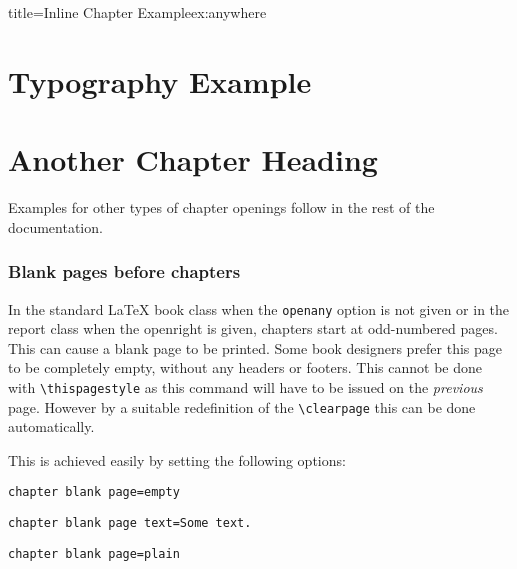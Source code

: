 \begin{decription}
\begin{texexample}{title=Inline Chapter Example}{ex:anywhere}
\chapter{Typography Example}
\lorem
\chapter{Another Chapter Heading}
\lorem
\end{texexample}


\addtocounter{chapter}{-1}

Examples for other types of chapter openings follow in the rest of the documentation.

\subsection{Blank pages before chapters}

In the standard LaTeX book class when the \texttt{openany} option is not given or in the report class when the openright is given, chapters start at odd-numbered pages. This can cause a blank page to be printed. Some book designers prefer this page to be completely empty, without any headers or footers. This cannot be done with \lstinline{\thispagestyle} as this command will have to be issued on the \textit{previous} page. However by a suitable redefinition of the
\lstinline{\clearpage} this can be done automatically.
\medskip

\begin{teX}
\makeatletter
\def\cleardoublepage{\clearpage\if@twoside\ifodd\c@page\else
  \hbox{}
  \vspace*{\fill}
  \begin{center}
    This page left intentionally blank.
  \end{center}
  \vspace{\fill}
  \thispagestyle{empty}
  \newpage
  \if@twocolumn\hbox{}\newpage\fi\fi\fi}
\makeatother
\end{teX}


This is achieved easily by setting the following options:
\bigskip

\begin{tcolorbox}
\lstinline{chapter blank page=empty}\par
\lstinline{chapter blank page text=Some text.}\par
\lstinline{chapter blank page=plain}\par
\end{tcolorbox}
\medskip




\end{decription}
